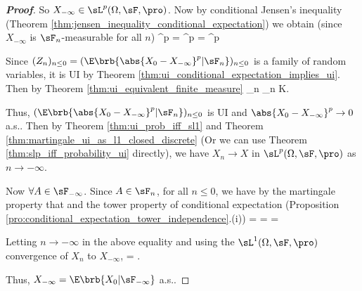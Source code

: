 \begin{proof}[\bf Proof]
So $X_{-\infty} \in \sL^p(\Omega,\sF,\pro)$. Now by conditional Jensen's inequality (Theorem \ref{thm:jensen_inequality_conditional_expectation}) we obtain (since $X_{-\infty}$ is $\sF_n$-measurable for all $n$)
\be
{}^p = ^p = ^p \leq \E{}
\ee

Since $(Z_n)_{n\leq 0} = (\E\brb{\abs{X_0- X_{-\infty}}^p|\sF_n})_{n\leq 0}$ is a family of random variables, it is UI by Theorem \ref{thm:ui_conditional_expectation_implies_ui}. Then by Theorem \ref{thm:ui_equivalent_finite_measure}
\be
\sup_{n} \E{} \leq \sup_{n} \E{}  K\to \infty.
\ee

Thus, $(\E\brb{\abs{X_0- X_{-\infty}}^p|\sF_n})_{n\leq 0}$ is UI and $\abs{X_0- X_{-\infty}}^p \to 0$ a.s.. Then by Theorem \ref{thm:ui_prob_iff_sl1} and Theorem \ref{thm:martingale_ui_as_l1_closed_discrete} (Or we can use Theorem \ref{thm:slp_iff_probability_ui} directly), we have $X_n \to X$ in $\sL^p(\Omega,\sF,\pro)$ as $n \to -\infty$.

Now $\forall A \in \sF_{-\infty}$. Since $A \in \sF_n$, for all $n \leq 0$, we have by the martingale property that and the tower property of conditional expectation (Proposition \ref{pro:conditional_expectation_tower_independence}.(i))
\be
\E{} = \E{} = \E{} = \E{}
\ee

Letting $n \to -\infty$ in the above equality and using the $\sL^1(\Omega,\sF,\pro)$ convergence of $X_n$ to $X_{-\infty}$,
\be
\E{} = \E{} \to \E{}.
\ee

Thus, $X_{-\infty} = \E\brb{X_0|\sF_{-\infty}}$ a.s..
\end{proof}





